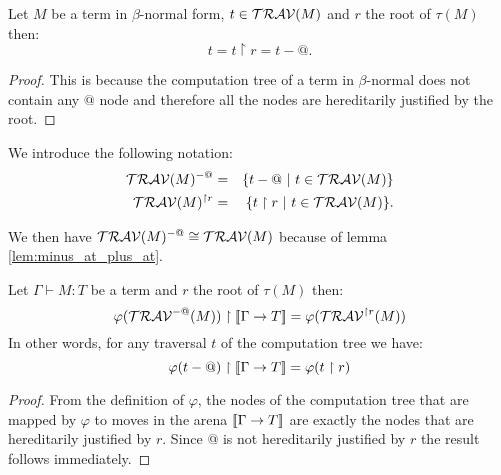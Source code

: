 \begin{lem}
Let $M$ be a term in $\beta$-normal form, $t \in
\mathcal{TRAV}(M)$ and $r$ the root of $\tau(M)$ then:
$$t = t \upharpoonright r = t - @.$$
\end{lem}
\begin{proof}
This is because the computation tree of a term in $\beta$-normal
does not contain any $@$ node and therefore all the nodes are
hereditarily justified by the root.
\end{proof}

We introduce the following notation:
\begin{eqnarray*}
\mathcal{TRAV}(M)^{-@} &=& \{ t - @ \ | \  t \in \mathcal{TRAV}(M) \} \\
\mathcal{TRAV}(M)^{\upharpoonright r} &=& \{ t  \upharpoonright r \ | \  t  \in \mathcal{TRAV}(M) \} .
\end{eqnarray*}

We then have $\mathcal{TRAV}(M)^{-@} \cong \mathcal{TRAV}(M)$ because of lemma \ref{lem:minus_at_plus_at}.

\begin{lem} Let $\Gamma \vdash M :T$ be a term and $r$ the root of $\tau(M)$ then:
\label{lem:varphi_filter}
$$ \varphi(\mathcal{TRAV}^{-@}(M)) \upharpoonright {[\![\Gamma \rightarrow T ]\!]} = \varphi(\mathcal{TRAV}^{\upharpoonright r}(M)) $$
In other words, for any traversal $t$ of the computation tree we have:
$$\varphi(t-@) \upharpoonright {[\![\Gamma \rightarrow T ]\!]} = \varphi(t\upharpoonright r)$$
\end{lem}
\begin{proof}
    From the definition of $\varphi$, the nodes of the computation tree that are mapped by $\varphi$
    to moves in the arena ${[\![ \Gamma \rightarrow T ]\!]}$ are exactly the nodes that are hereditarily justified by $r$.
    Since $@$ is not hereditarily justified by $r$ the result follows immediately.
\end{proof}

